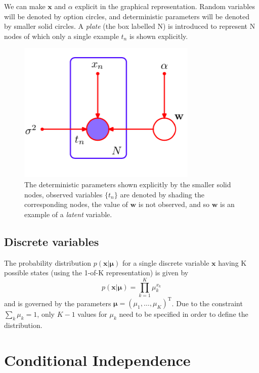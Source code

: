 \documentclass[5p,sort&compress]{elsarticle}
\begin{document}
We can make $\mathbf{x}$ and $\alpha$ explicit in the graphical representation. Random variables will be denoted by option circles, and deterministic parameters will be denoted by smaller solid circles. A \textit{plate} (the box labelled N) is introduced to represent N nodes of which only a single example $t_n$ is shown explicitly.

\begin{figure}[ht]
     \centering
     \includegraphics[width = 0.6\linewidth]{figure/figure8_6.png}
     \caption{The deterministic parameters shown explicitly by the smaller solid nodes, observed variables $\{t_n\}$ are denoted by shading the corresponding nodes, the value of $\mathbf{w}$ is not observed, and so $\mathbf{w}$ is an example of a \textit{latent} variable.}
     \label{fig:8_6}
\end{figure}


\subsection{Discrete variables}

The probability distribution $p(\mathbf{x}| \boldsymbol{\mu})$ for a single discrete variable $\mathbf{x}$ having K possible states (using the 1-of-K representation) is given by
\begin{equation}
p(\mathbf{x} | \boldsymbol{\mu})=\prod_{k=1}^{K} \mu_{k}^{x_{k}}  
\end{equation}
and is governed by the parameters $\boldsymbol{\mu} = (\mu_1, \ldots, \mu_K)^{\mathrm{T}}$. Due to the constraint $\sum_{k} \mu_{k}=1$, only $K-1$ values for $\mu_k$ need to be specified in order to define the distribution.


\section{Conditional Independence}
\end{document}
